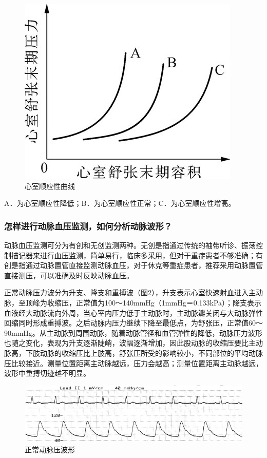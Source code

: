 \begin{figure}[!htbp]
 \centering
 \includegraphics{./images/Image00030.jpg}
 \captionsetup{justification=centering}
 \caption{心室顺应性曲线}
 \label{fig4-3}
  \end{figure} 

A．为心室顺应性降低；B．为心室顺应性正常；C．为心室顺应性增高。

\subsubsection{怎样进行动脉血压监测，如何分析动脉波形？}

动脉血压监测可分为有创和无创监测两种。无创是指通过传统的袖带听诊、振荡控制描记器来进行血压监测，简单易行，临床多采用，但对于重症患者不够准确；有创是指通过动脉置管直接监测动脉血压，对于休克等重症患者，推荐采用动脉置管直接测压，可以准确及时反映动脉血压。

正常动脉压力波分为升支、降支和重搏波（图\ref{fig4-4}），升支表示心室快速射血进入主动脉，至顶峰为收缩压，正常值为100～140mmHg（1mmHg＝0.133kPa）；降支表示血液经大动脉流向外周，当心室内压力低于主动脉时，主动脉瓣关闭与大动脉弹性回缩同时形成重搏波。之后动脉内压力继续下降至最低点，为舒张压，正常值60～90mmHg。从主动脉到周围动脉，随着动脉管径和血管弹性的降低，动脉压力波形也随之变化，表现为升支逐渐陡峭，波幅逐渐增加，因此股动脉的收缩压要比主动脉高，下肢动脉的收缩压比上肢高，舒张压所受的影响较小，不同部位的平均动脉压比较接近。测量位置距离主动脉越远，压力会越高；测量位置距离主动脉越远，波形中重搏切迹越不明显。

\begin{figure}[!htbp]
 \centering
 \includegraphics{./images/Image00031.jpg}
 \captionsetup{justification=centering}
 \caption{正常动脉压波形}
 \label{fig4-4}
  \end{figure} 

